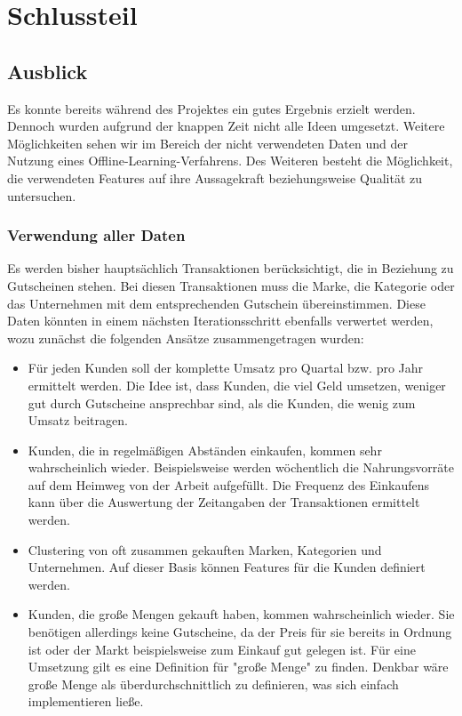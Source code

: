\section{Schlussteil}

\subsection{Ausblick}
Es konnte bereits während des Projektes ein gutes Ergebnis erzielt
werden. Dennoch wurden aufgrund der knappen Zeit nicht alle Ideen
umgesetzt. Weitere Möglichkeiten sehen wir im Bereich der nicht
verwendeten Daten und der Nutzung eines Offline-Learning-Verfahrens.
Des Weiteren besteht die Möglichkeit, die verwendeten Features auf ihre
Aussagekraft beziehungsweise Qualität zu untersuchen.

\subsubsection{Verwendung aller Daten}
Es werden bisher hauptsächlich Transaktionen berücksichtigt, die in Beziehung zu Gutscheinen stehen.
Bei diesen Transaktionen muss die Marke, die Kategorie oder das Unternehmen mit dem entsprechenden Gutschein übereinstimmen.
Diese Daten könnten in einem nächsten Iterationsschritt ebenfalls verwertet werden, wozu zunächst die folgenden Ansätze zusammengetragen wurden:
	
\begin{itemize}
\item Für jeden Kunden soll der komplette Umsatz pro Quartal bzw. pro Jahr ermittelt werden. Die Idee ist, dass Kunden, die viel Geld umsetzen, weniger gut durch Gutscheine ansprechbar sind, als die Kunden, die wenig zum Umsatz beitragen. 
 
\item Kunden, die in regelmäßigen Abständen einkaufen, kommen sehr wahrscheinlich wieder.
Beispielsweise werden wöchentlich die Nahrungsvorräte auf dem Heimweg von der Arbeit aufgefüllt.
Die Frequenz des Einkaufens kann über die Auswertung der Zeitangaben der Transaktionen ermittelt werden.

\item Clustering von oft zusammen gekauften Marken, Kategorien und Unternehmen. Auf dieser Basis können Features für die Kunden definiert werden.
	
\item Kunden, die große Mengen gekauft haben, kommen wahrscheinlich wieder. Sie benötigen allerdings keine Gutscheine, da der Preis für sie bereits in Ordnung ist oder der Markt beispielsweise zum Einkauf gut gelegen ist. Für eine Umsetzung gilt es eine Definition für "große Menge" zu finden.  Denkbar wäre große Menge als überdurchschnittlich zu definieren, was sich einfach implementieren ließe.
\end{itemize}

